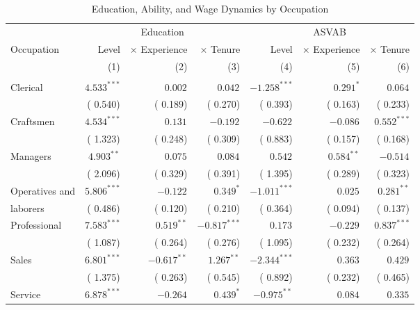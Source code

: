 \begin{table}[p]\centering
\caption{Education, Ability, and Wage Dynamics by Occupation}
\label{tab:ols_learning}
\begin{threeparttable}\footnotesize
\setlength{\tabcolsep}{3pt}
\begin{tabular*}{\textwidth}{@{\extracolsep{\fill}}lrrrrrr@{}}
\toprule
& \multicolumn{3}{c}{Education} & \multicolumn{3}{c}{ASVAB} \\
\cmidrule(lr){2-4}\cmidrule(lr){5-7}
Occupation & Level & \(\times\) Experience & \(\times\) Tenure & Level & \(\times\) Experience & \(\times\) Tenure \\
& (1) & (2) & (3) & (4) & (5) & (6) \\ \midrule
\addlinespace \multicolumn{7}{l}{A. NLSY79} \\
Clerical & \( 4.533^{***}\) & \( 0.002^{}\) & \( 0.042^{}\) & \(-1.258^{***}\) & \( 0.291^{*}\) & \( 0.064^{}\) \\
 & ( 0.540) & ( 0.189) & ( 0.270) & ( 0.393) & ( 0.163) & ( 0.233) \\
Craftsmen & \( 4.534^{***}\) & \( 0.131^{}\) & \(-0.192^{}\) & \(-0.622^{}\) & \(-0.086^{}\) & \( 0.552^{***}\) \\
 & ( 1.323) & ( 0.248) & ( 0.309) & ( 0.883) & ( 0.157) & ( 0.168) \\
Managers & \( 4.903^{**}\) & \( 0.075^{}\) & \( 0.084^{}\) & \( 0.542^{}\) & \( 0.584^{**}\) & \(-0.514^{}\) \\
 & ( 2.096) & ( 0.329) & ( 0.391) & ( 1.395) & ( 0.289) & ( 0.323) \\
Operatives and & \( 5.806^{***}\) & \(-0.122^{}\) & \( 0.349^{*}\) & \(-1.011^{***}\) & \( 0.025^{}\) & \( 0.281^{**}\) \\
laborers & ( 0.486) & ( 0.120) & ( 0.210) & ( 0.364) & ( 0.094) & ( 0.137) \\
Professional & \( 7.583^{***}\) & \( 0.519^{**}\) & \(-0.817^{***}\) & \( 0.173^{}\) & \(-0.229^{}\) & \( 0.837^{***}\) \\
 & ( 1.087) & ( 0.264) & ( 0.276) & ( 1.095) & ( 0.232) & ( 0.264) \\
Sales & \( 6.801^{***}\) & \(-0.617^{**}\) & \( 1.267^{**}\) & \(-2.344^{***}\) & \( 0.363^{}\) & \( 0.429^{}\) \\
 & ( 1.375) & ( 0.263) & ( 0.545) & ( 0.892) & ( 0.232) & ( 0.465) \\
Service & \( 6.878^{***}\) & \(-0.264^{}\) & \( 0.439^{*}\) & \(-0.975^{**}\) & \( 0.084^{}\) & \( 0.335^{}\) \\

\end{tabular*}
\end{threeparttable}
\end{table}
